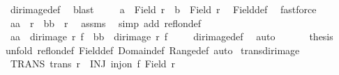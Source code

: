 \begin{isabellebody}
\ dir{\isacharunderscore}{\kern0pt}image{\isacharunderscore}{\kern0pt}def\ \isamarkupfalse%
\ blast\isanewline
\ \ \ \isamarkupfalse%
\ {\isachardoublequoteopen}a\ {\isasymin}\ Field\ r\ {\isasymand}\ b\ {\isasymin}\ Field\ r{\isachardoublequoteclose}\ \isamarkupfalse%
\ Field{\isacharunderscore}{\kern0pt}def\ \isamarkupfalse%
\ fastforce\isanewline
\ \ \ \isamarkupfalse%
\ {\isachardoublequoteopen}{\isacharparenleft}{\kern0pt}a{\isacharcomma}{\kern0pt}a{\isacharparenright}{\kern0pt}\ {\isasymin}\ r\ {\isasymand}\ {\isacharparenleft}{\kern0pt}b{\isacharcomma}{\kern0pt}b{\isacharparenright}{\kern0pt}\ {\isasymin}\ r{\isachardoublequoteclose}\ \isamarkupfalse%
\ assms\ \isamarkupfalse%
\ {\isacharparenleft}{\kern0pt}simp\ add{\isacharcolon}{\kern0pt}\ refl{\isacharunderscore}{\kern0pt}on{\isacharunderscore}{\kern0pt}def{\isacharparenright}{\kern0pt}\isanewline
\ \ \ \isamarkupfalse%
\ {}\ \isamarkupfalse%
\ {\isachardoublequoteopen}{\isacharparenleft}{\kern0pt}a{\isacharprime}{\kern0pt}{\isacharcomma}{\kern0pt}a{\isacharprime}{\kern0pt}{\isacharparenright}{\kern0pt}\ {\isasymin}\ dir{\isacharunderscore}{\kern0pt}image\ r\ f\ {\isasymand}\ {\isacharparenleft}{\kern0pt}b{\isacharprime}{\kern0pt}{\isacharcomma}{\kern0pt}b{\isacharprime}{\kern0pt}{\isacharparenright}{\kern0pt}\ {\isasymin}\ dir{\isacharunderscore}{\kern0pt}image\ r\ f{\isachardoublequoteclose}\isanewline
\ \ \ \isamarkupfalse%
\ dir{\isacharunderscore}{\kern0pt}image{\isacharunderscore}{\kern0pt}def\ \isamarkupfalse%
\ auto\isanewline
\ \ \isacommand{{\isacharbraceright}{\kern0pt}}\isamarkupfalse%
\isanewline
\ \ \isamarkupfalse%
\ {\isacharquery}{\kern0pt}thesis\isanewline
\ \ \isamarkupfalse%
{\isacharparenleft}{\kern0pt}unfold\ refl{\isacharunderscore}{\kern0pt}on{\isacharunderscore}{\kern0pt}def\ Field{\isacharunderscore}{\kern0pt}def\ Domain{\isacharunderscore}{\kern0pt}def\ Range{\isacharunderscore}{\kern0pt}def{\isacharcomma}{\kern0pt}\ auto{\isacharparenright}{\kern0pt}\isanewline
{}\isamarkupfalse%
%
\endisatagproof
{\isafoldproof}%
%
\isadelimproof
\isanewline
%
\endisadelimproof
\isanewline
{}\isamarkupfalse%
\ trans{\isacharunderscore}{\kern0pt}dir{\isacharunderscore}{\kern0pt}image{\isacharcolon}{\kern0pt}\isanewline
{}\ TRANS{\isacharcolon}{\kern0pt}\ {\isachardoublequoteopen}trans\ r{\isachardoublequoteclose}\ \ INJ{\isacharcolon}{\kern0pt}\ {\isachardoublequoteopen}inj{\isacharunderscore}{\kern0pt}on\ f\ {\isacharparenleft}{\kern0pt}Field\ r{\isacharparenright}{\kern0pt}{\isachardoublequoteclose}\isanewline

\end{isabellebody}
